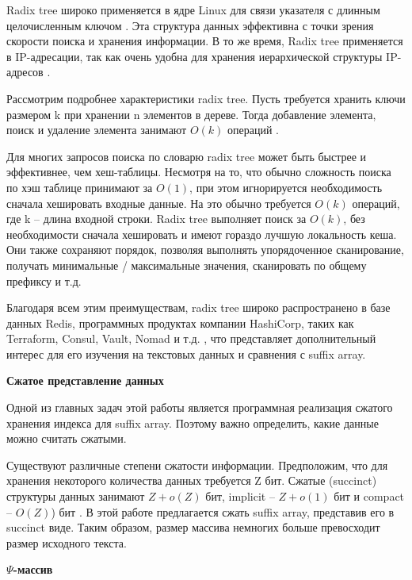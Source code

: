 Radix tree широко применяется в ядре Linux для связи указателя с длинным целочисленным ключом \cite{Linux2018}.
Эта структура данных эффективна с точки зрения скорости поиска и хранения информации.
В то же время, Radix tree применяется в IP-адресации, так как очень удобна для хранения
иерархической структуры IP-адресов \cite{Radix2019}.

Рассмотрим подробнее характеристики radix tree. Пусть требуется хранить ключи размером k
при хранении n элементов в дереве. Тогда добавление элемента, поиск и удаление элемента
занимают $O(k)$ операций \cite{leis2013adaptive}.

Для многих запросов поиска по словарю radix tree может быть быстрее и эффективнее, чем хеш-таблицы.
Несмотря на то, что обычно сложность поиска по хэш таблице принимают за $O(1)$,
при этом игнорируется необходимость сначала хешировать входные данные.
На это обычно требуется $O(k)$ операций, где k -- длина входной строки.
Radix tree выполняет поиск за $O(k)$, без необходимости сначала хешировать и имеют гораздо лучшую локальность кеша.
Они также сохраняют порядок, позволяя выполнять упорядоченное сканирование,
получать минимальные / максимальные значения, сканировать по общему префиксу и т.д.

Благодаря всем этим преимуществам, radix tree широко распространено в базе данных Redis, программных продуктах
компании HashiCorp, таких как Terraform, Consul, Vault, Nomad и т.д. \cite{Redis2018},
что представляет дополнительный интерес для его изучения на текстовых данных и сравнения с suffix array.

\textbf{Сжатое представление данных}

Одной из главных задач этой работы является программная реализация сжатого хранения индекса для suffix array.
Поэтому важно определить, какие данные можно считать сжатыми.

Существуют различные степени сжатости информации.
Предположим, что для хранения некоторого количества данных требуется Z бит.
Сжатые (succinct) структуры данных занимают \(Z + o(Z)\) бит, implicit -- \(Z + o(1)\) бит и
compact -- \(O(Z)\)) бит \cite{huo2014practical}. В этой работе предлагается сжать suffix array, представив его в succinct виде.
Таким образом, размер массива немногих больше превосходит размер исходного текста.

\textbf{$\Psi$-массив}

